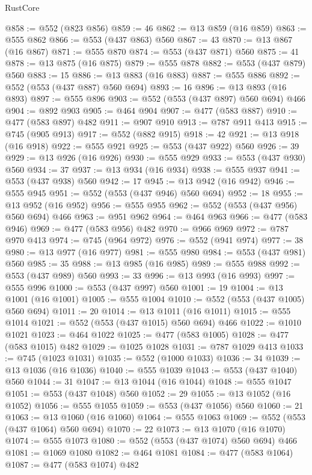 \begin{lexlean}{RustCore}
\begin{coremodule}
@858 := @552 (@823 @856)
@859 := 46
@862 := @13 @859 (@16 @859)
@863 := @555 @862
@866 := @553 (@437 @863) @560
@867 := 43
@870 := @13 @867 (@16 @867)
@871 := @555 @870
@874 := @553 (@437 @871) @560
@875 := 41
@878 := @13 @875 (@16 @875)
@879 := @555 @878
@882 := @553 (@437 @879) @560
@883 := 15
@886 := @13 @883 (@16 @883)
@887 := @555 @886
@892 := @552 (@553 (@437 @887) @560 @694)
@893 := 16
@896 := @13 @893 (@16 @893)
@897 := @555 @896
@903 := @552 (@553 (@437 @897) @560 @694) @466
@904 := @892 @903
@905 := @464 @904
@907 := @477 (@583 @887)
@910 := @477 (@583 @897) @482
@911 := @907 @910
@913 := @787 @911 @413
@915 := @745 (@905 @913)
@917 := @552 (@882 @915)
@918 := 42
@921 := @13 @918 (@16 @918)
@922 := @555 @921
@925 := @553 (@437 @922) @560
@926 := 39
@929 := @13 @926 (@16 @926)
@930 := @555 @929
@933 := @553 (@437 @930) @560
@934 := 37
@937 := @13 @934 (@16 @934)
@938 := @555 @937
@941 := @553 (@437 @938) @560
@942 := 17
@945 := @13 @942 (@16 @942)
@946 := @555 @945
@951 := @552 (@553 (@437 @946) @560 @694)
@952 := 18
@955 := @13 @952 (@16 @952)
@956 := @555 @955
@962 := @552 (@553 (@437 @956) @560 @694) @466
@963 := @951 @962
@964 := @464 @963
@966 := @477 (@583 @946)
@969 := @477 (@583 @956) @482
@970 := @966 @969
@972 := @787 @970 @413
@974 := @745 (@964 @972)
@976 := @552 (@941 @974)
@977 := 38
@980 := @13 @977 (@16 @977)
@981 := @555 @980
@984 := @553 (@437 @981) @560
@985 := 35
@988 := @13 @985 (@16 @985)
@989 := @555 @988
@992 := @553 (@437 @989) @560
@993 := 33
@996 := @13 @993 (@16 @993)
@997 := @555 @996
@1000 := @553 (@437 @997) @560
@1001 := 19
@1004 := @13 @1001 (@16 @1001)
@1005 := @555 @1004
@1010 := @552 (@553 (@437 @1005) @560 @694)
@1011 := 20
@1014 := @13 @1011 (@16 @1011)
@1015 := @555 @1014
@1021 := @552 (@553 (@437 @1015) @560 @694) @466
@1022 := @1010 @1021
@1023 := @464 @1022
@1025 := @477 (@583 @1005)
@1028 := @477 (@583 @1015) @482
@1029 := @1025 @1028
@1031 := @787 @1029 @413
@1033 := @745 (@1023 @1031)
@1035 := @552 (@1000 @1033)
@1036 := 34
@1039 := @13 @1036 (@16 @1036)
@1040 := @555 @1039
@1043 := @553 (@437 @1040) @560
@1044 := 31
@1047 := @13 @1044 (@16 @1044)
@1048 := @555 @1047
@1051 := @553 (@437 @1048) @560
@1052 := 29
@1055 := @13 @1052 (@16 @1052)
@1056 := @555 @1055
@1059 := @553 (@437 @1056) @560
@1060 := 21
@1063 := @13 @1060 (@16 @1060)
@1064 := @555 @1063
@1069 := @552 (@553 (@437 @1064) @560 @694)
@1070 := 22
@1073 := @13 @1070 (@16 @1070)
@1074 := @555 @1073
@1080 := @552 (@553 (@437 @1074) @560 @694) @466
@1081 := @1069 @1080
@1082 := @464 @1081
@1084 := @477 (@583 @1064)
@1087 := @477 (@583 @1074) @482

\end{coremodule}
\end{lexlean}
